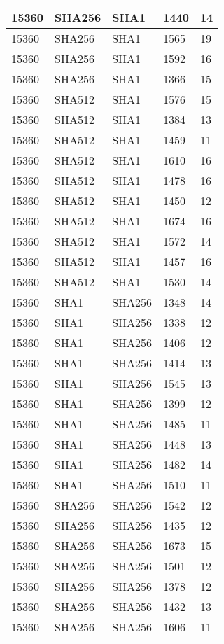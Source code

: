 \begin{tabular}{| l | l | l | l | l |}
15360 & SHA256 & SHA1 & 1440 & 14 \\ \hline 
15360 & SHA256 & SHA1 & 1565 & 19 \\ \hline 
15360 & SHA256 & SHA1 & 1592 & 16 \\ \hline 
15360 & SHA256 & SHA1 & 1366 & 15 \\ \hline 
15360 & SHA512 & SHA1 & 1576 & 15 \\ \hline 
15360 & SHA512 & SHA1 & 1384 & 13 \\ \hline 
15360 & SHA512 & SHA1 & 1459 & 11 \\ \hline 
15360 & SHA512 & SHA1 & 1610 & 16 \\ \hline 
15360 & SHA512 & SHA1 & 1478 & 16 \\ \hline 
15360 & SHA512 & SHA1 & 1450 & 12 \\ \hline 
15360 & SHA512 & SHA1 & 1674 & 16 \\ \hline 
15360 & SHA512 & SHA1 & 1572 & 14 \\ \hline 
15360 & SHA512 & SHA1 & 1457 & 16 \\ \hline 
15360 & SHA512 & SHA1 & 1530 & 14 \\ \hline 
15360 & SHA1 & SHA256 & 1348 & 14 \\ \hline 
15360 & SHA1 & SHA256 & 1338 & 12 \\ \hline 
15360 & SHA1 & SHA256 & 1406 & 12 \\ \hline 
15360 & SHA1 & SHA256 & 1414 & 13 \\ \hline 
15360 & SHA1 & SHA256 & 1545 & 13 \\ \hline 
15360 & SHA1 & SHA256 & 1399 & 12 \\ \hline 
15360 & SHA1 & SHA256 & 1485 & 11 \\ \hline 
15360 & SHA1 & SHA256 & 1448 & 13 \\ \hline 
15360 & SHA1 & SHA256 & 1482 & 14 \\ \hline 
15360 & SHA1 & SHA256 & 1510 & 11 \\ \hline 
15360 & SHA256 & SHA256 & 1542 & 12 \\ \hline 
15360 & SHA256 & SHA256 & 1435 & 12 \\ \hline 
15360 & SHA256 & SHA256 & 1673 & 15 \\ \hline 
15360 & SHA256 & SHA256 & 1501 & 12 \\ \hline 
15360 & SHA256 & SHA256 & 1378 & 12 \\ \hline 
15360 & SHA256 & SHA256 & 1432 & 13 \\ \hline 
15360 & SHA256 & SHA256 & 1606 & 11 \\ \hline 

\end{tabular}
